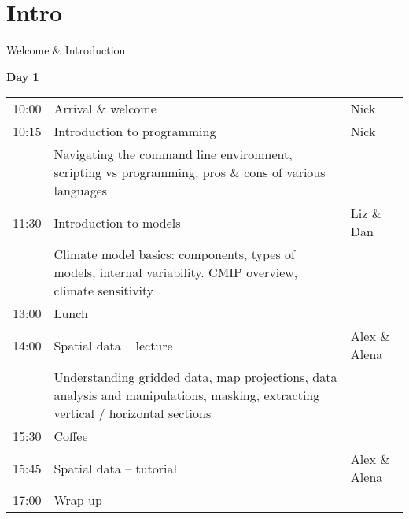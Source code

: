 

\section{Intro}
\begin{frame}{\insertsectionnumber{ |} Welcome \& Introduction}

\textbf{Day 1} \\
\vspace*{0.75cm}\begin{tabular}{p{0.75cm}|p{7.5cm}|p{1.75cm}}
\hline 
10:00 & Arrival \& welcome & Nick \\
10:15 & Introduction to programming & Nick \\
& \small{Navigating the command line environment, scripting vs programming, pros \& cons of various languages} & \\
11:30 & Introduction to models & Liz \& Dan \\
& \small{Climate model basics: components, types of models, internal variability. CMIP overview, climate sensitivity} & \\
13:00 & Lunch &  \\
14:00 & Spatial data -- lecture & Alex \& Alena \\
& \small{Understanding gridded data, map projections, data analysis and manipulations, masking, extracting vertical / horizontal sections} & \\
15:30 & Coffee & \\
15:45 & Spatial data -- tutorial & Alex \& Alena \\
17:00 & Wrap-up & \\
\hline
\end{tabular}


\end{frame}

